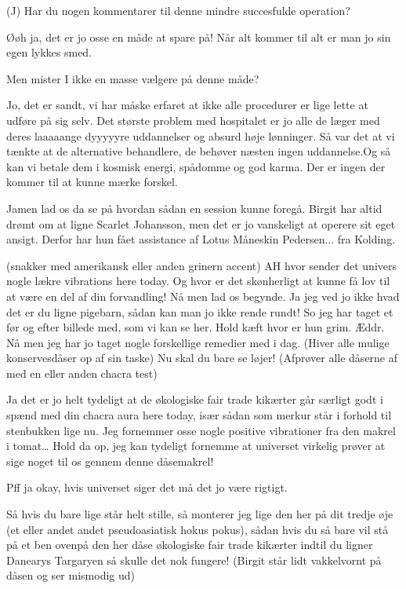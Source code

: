\documentclass[a4paper,11pt]{article}
\begin{document}
\begin{sketch}
 \says (J) Har du nogen kommentarer til denne mindre succesfulde operation? 

Øøh ja, det er jo osse en måde at spare på! Når alt kommer til alt er man jo sin egen lykkes smed. 

Men mister I ikke en masse vælgere på denne måde? 

 Jo, det er sandt, vi har måske erfaret at ikke alle procedurer er lige lette at udføre på sig selv. Det største problem med hospitalet er jo alle de læger med deres laaaaange dyyyyyre uddannelser og absurd høje lønninger. Så var det at vi tænkte at de alternative behandlere, de behøver næsten ingen uddannelse.Og så kan vi betale dem i kosmisk energi, spådomme og god karma. Der er ingen der kommer til at kunne mærke forskel. 

 Jamen lad os da se på hvordan sådan en session kunne foregå. Birgit har altid drømt om at ligne Scarlet Johansson, men det er jo vanskeligt at operere sit eget ansigt. Derfor har hun fået assistance af Lotus Måneskin Pedersen... fra Kolding. 

 (snakker med amerikansk eller anden grinern accent) AH hvor sender det univers nogle lækre vibrations here today. Og hvor er det skønherligt at kunne få lov til at være en del af din forvandling! Nå men lad os begynde. Ja jeg ved jo ikke hvad det er du ligne pigebarn, sådan kan man jo ikke rende rundt! So jeg har taget et før og efter billede med, som vi kan se her. 
 Hold kæft hvor er hun grim.
 Æddr.
 Nå men jeg har jo taget nogle forskellige remedier med i dag. (Hiver alle mulige konservesdåser op af sin taske) Nu skal du bare se løjer! (Afprøver alle dåserne af med en eller anden chacra test) 

 Ja det er jo helt tydeligt at de økologiske fair trade kikærter går særligt godt i spænd med din chacra aura here today, især sådan som merkur står i forhold til stenbukken lige nu. 
Jeg fornemmer osse nogle positive vibrationer fra den makrel i tomat… Hold da op, jeg kan tydeligt fornemme at universet virkelig prøver at sige noget til os gennem denne dåsemakrel! 

 Pff ja okay, hvis universet siger det må det jo være rigtigt. 

 Så hvis du bare lige står helt stille, så monterer jeg lige den her på dit tredje øje (et eller andet andet pseudoasiatisk hokus pokus), sådan hvis du så bare vil stå på et ben ovenpå den her dåse økologiske fair trade kikærter indtil du ligner Danearys Targaryen så skulle det nok fungere! (Birgit står lidt vakkelvornt på dåsen og ser mismodig ud) 


\end{sketch}
\end{document}
